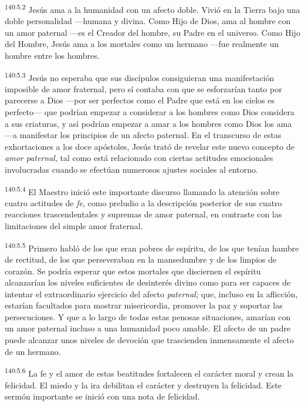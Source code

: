 \par 
\textsuperscript{140:5.2} Jesús ama a la humanidad con un afecto doble. Vivió en la Tierra bajo una doble personalidad ---humana y divina. Como Hijo de Dios, ama al hombre con un amor paternal ---es el Creador del hombre, su Padre en el universo. Como Hijo del Hombre, Jesús ama a los mortales como un hermano ---fue realmente un hombre entre los hombres.

\par 
\textsuperscript{140:5.3} Jesús no esperaba que sus discípulos consiguieran una manifestación imposible de amor fraternal, pero sí contaba con que se esforzarían tanto por parecerse a Dios ---por ser perfectos como el Padre que está en los cielos es perfecto--- que podrían empezar a considerar a los hombres como Dios considera a sus criaturas, y así podrían empezar a amar a los hombres como Dios los ama ---a manifestar los principios de un afecto paternal. En el transcurso de estas exhortaciones a los doce apóstoles, Jesús trató de revelar este nuevo concepto de \textit{amor paternal}, tal como está relacionado con ciertas actitudes emocionales involucradas cuando se efectúan numerosos ajustes sociales al entorno.

\par 
\textsuperscript{140:5.4} El Maestro inició este importante discurso llamando la atención sobre cuatro actitudes de \textit{fe}, como preludio a la descripción posterior de sus cuatro reacciones trascendentales y supremas de amor paternal, en contraste con las limitaciones del simple amor fraternal.

\par 
\textsuperscript{140:5.5} Primero habló de los que eran pobres de espíritu, de los que tenían hambre de rectitud, de los que perseveraban en la mansedumbre y de los limpios de corazón. Se podría esperar que estos mortales que disciernen el espíritu alcanzarían los niveles suficientes de desinterés divino como para ser capaces de intentar el extraordinario ejercicio del afecto \textit{paternal;} que, incluso en la aflicción, estarían facultados para mostrar misericordia, promover la paz y soportar las persecuciones. Y que a lo largo de todas estas penosas situaciones, amarían con un amor paternal incluso a una humanidad poco amable. El afecto de un padre puede alcanzar unos niveles de devoción que trascienden inmensamente el afecto de un hermano.

\par 
\textsuperscript{140:5.6} La fe y el amor de estas beatitudes fortalecen el carácter moral y crean la felicidad. El miedo y la ira debilitan el carácter y destruyen la felicidad. Este sermón importante se inició con una nota de felicidad.


